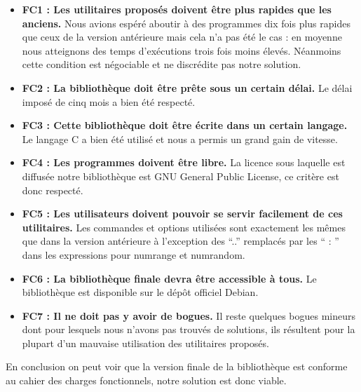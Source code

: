 \begin{itemize}
\item [\textbullet] \textbf{FC1 : Les utilitaires propos\'es doivent \^etre plus rapides que les anciens.}
\newline
\normalsize
Nous avions esp\'er\'e aboutir \`a des programmes dix fois plus rapides que ceux de la version ant\'erieure mais cela n'a pas \'et\'e le cas : 
en moyenne nous atteignons des temps d'ex\'ecutions trois fois moins \'elev\'es. N\'eanmoins cette condition est n\'egociable et ne discr\'edite pas notre solution.
\item [\textbullet] \textbf{FC2 : La biblioth\`eque doit \^etre pr\^ete sous un certain d\'elai.}
\newline
\normalsize
Le d\'elai impos\'e de cinq mois a bien \'et\'e respect\'e.
\item [\textbullet] \textbf{FC3 : Cette biblioth\`eque doit \^etre \'ecrite dans un certain langage.}
\newline
\normalsize
Le langage C a bien \'et\'e utilis\'e et nous a permis un grand gain de vitesse.
\item [\textbullet] \textbf{FC4 : Les programmes doivent \^etre libre.}
\newline
\normalsize
La licence sous laquelle est diffus\'ee notre biblioth\`eque est GNU General Public License, ce crit\`ere est donc respect\'e.
\item [\textbullet] \textbf{FC5 : Les utilisateurs doivent pouvoir se servir facilement de ces utilitaires.}
\newline
\normalsize
Les commandes et options utilis\'ees sont exactement les m\^emes que dans la version ant\'erieure à l'exception des ``..'' remplac\'es par les `` : '' dans les expressions pour numrange et numrandom.
\item [\textbullet] \textbf{FC6 : La biblioth\`eque finale devra \^etre accessible  \`a tous.}
\newline
\normalsize
Le biblioth\`eque est disponible sur le d\'ep\^ot officiel Debian.
\item [\textbullet] \textbf{FC7 : Il ne doit pas y avoir de bogues.}
\newline
\normalsize
Il reste quelques bogues mineurs dont pour lesquels nous n'avons pas trouv\'es de solutions, ils r\'esultent pour la plupart d'un mauvaise utilisation des utilitaires propos\'es.
\end{itemize}

En conclusion on peut voir que la version finale de la biblioth\`eque est conforme au cahier des charges fonctionnels, notre solution est donc viable.